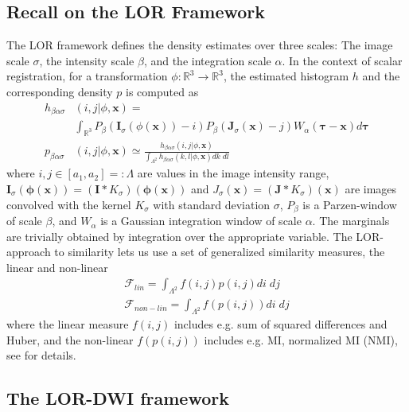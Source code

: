 \documentclass[twocolumn]{svjour3}
\begin{document}
\subsection{Recall on the LOR Framework}
The LOR framework defines the density estimates over three scales: The image scale
$\sigma$, the intensity scale $\beta$, and the integration scale $\alpha$. In the context
of scalar registration, for a transformation $\phi:\mathbb{R}^3\rightarrow\mathbb{R}^3$,
the estimated histogram $h$ and the corresponding density $p$ is computed as
\begin{align}
\label{eq:loih}
  h_{\beta\alpha\sigma}&(i,j|\phi,\bm x)=\\
                 &\int_{\mathbb R^3}P_\beta( \bm I_{\sigma}(\phi(\bm x))-i)
                   P_\beta( \bm J_{\sigma}(\bm x)-j)W_\alpha(\bm \tau-\bm x)d\bm \tau\nonumber \\
  \label{eq:loipdf}
  p_{\beta\alpha\sigma}&(i,j|\phi,\bm x)\simeq \frac{h_{\beta\alpha\sigma}(i,j|\phi,\bm x)}
                         {\int_{\Lambda^2} h_{\beta\alpha\sigma}(k,l|\phi,\bm x)dk\; dl}
\end{align} 
where $i,j\in[a_1, a_2] =: \Lambda$ are values in the image intensity range,
$\bm I_{\sigma}(\bm \phi(\bm x))=(\bm I*K_\sigma)(\bm \phi(\bm x))$ and
$ J_{\sigma}(\bm x)=(\bm J*K_\sigma)(\bm x)$ are images convolved with the kernel
$K_\sigma$ with standard deviation $\sigma$, $P_\beta$ is a Parzen-window of scale
$\beta$, and $W_\alpha$ is a Gaussian integration window of scale $\alpha$. The marginals
are trivially obtained by integration over the appropriate variable.  The LOR-approach to
similarity lets us use a set of generalized similarity measures, the linear and non-linear
\begin{align}\label{eq:sim}
  \mathcal{F}_{lin}=\int_{\Lambda^2}f(i,j)p(i,j)di\; dj\\ \mathcal{F}_{non-lin}=\int_{\Lambda^2}f(p(i,j))di\; dj
\end{align}
where the linear measure $f(i,j)$ includes e.g. sum of squared differences and Huber, and
the non-linear $f(p(i,j))$ includes e.g. MI, normalized MI (NMI), see
\cite{darknersporring2012pami} for details.

\subsection{The LOR-DWI framework}
\end{document}
